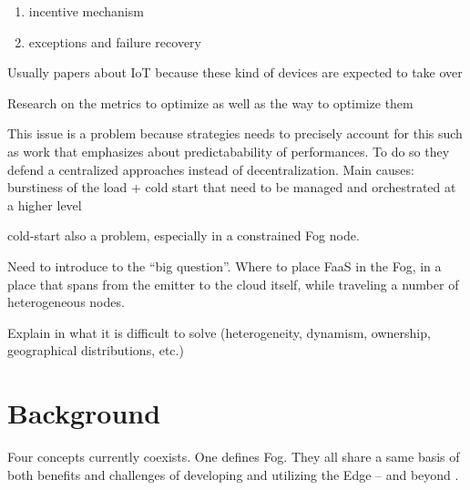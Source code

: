 \documentclass[11pt]{sdm}
\begin{document}
\begin{itemize}
{{\begin{enumerate}
        \item incentive mechanism
        \item exceptions and failure recovery
    \end{enumerate}
    }
    \item Usually papers about IoT because these kind of devices are expected to take over
    \item Research on the metrics to optimize as well as the way to optimize them
    \item This issue is a problem because strategies needs to precisely account for this such as  work that emphasizes about predictabability of performances. To do so they defend a centralized approaches instead of decentralization. Main causes: burstiness of the load + cold start that need to be managed and orchestrated at a higher level
    \item cold-start also a problem, especially in a constrained Fog node.
    \item Need to introduce to the ``big question''. Where to place \gls{FaaS} in the Fog, in a place that spans from the emitter to the cloud itself, while traveling a number of heterogeneous nodes.
    \item Explain in what it is difficult to solve (heterogeneity, dynamism, ownership, geographical distributions, etc.)
    }

    
\end{itemize}

\section{Background}

Four concepts currently coexists. One defines Fog. They all share a same basis of both benefits and challenges of developing and utilizing the Edge -- and beyond \cite{george_nanolambda_2020}.
\end{document}
